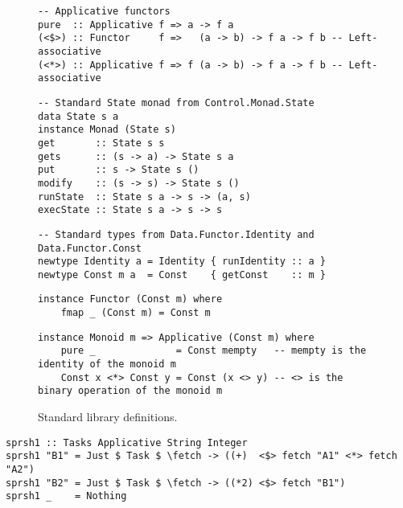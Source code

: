 \begin{figure}
\begin{verbatim}
-- Applicative functors
pure  :: Applicative f => a -> f a
(<$>) :: Functor     f =>   (a -> b) -> f a -> f b -- Left-associative
(<*>) :: Applicative f => f (a -> b) -> f a -> f b -- Left-associative
\end{verbatim}
\vspace{1mm}
\begin{verbatim}
-- Standard State monad from Control.Monad.State
data State s a
instance Monad (State s)
get       :: State s s
gets      :: (s -> a) -> State s a
put       :: s -> State s ()
modify    :: (s -> s) -> State s ()
runState  :: State s a -> s -> (a, s)
execState :: State s a -> s -> s
\end{verbatim}
\vspace{1mm}
\begin{verbatim}
-- Standard types from Data.Functor.Identity and Data.Functor.Const
newtype Identity a = Identity { runIdentity :: a }
newtype Const m a  = Const    { getConst    :: m }
\end{verbatim}
\vspace{1mm}
\begin{verbatim}
instance Functor (Const m) where
    fmap _ (Const m) = Const m
\end{verbatim}
\vspace{1mm}
\begin{verbatim}
instance Monoid m => Applicative (Const m) where
    pure _              = Const mempty   -- mempty is the identity of the monoid m
    Const x <*> Const y = Const (x <> y) -- <> is the binary operation of the monoid m
\end{verbatim}
\caption{Standard library definitions.}\label{fig-stdlib}
\end{figure}

\vspace{1mm}
\begin{verbatim}
sprsh1 :: Tasks Applicative String Integer
sprsh1 "B1" = Just $ Task $ \fetch -> ((+)  <$> fetch "A1" <*> fetch "A2")
sprsh1 "B2" = Just $ Task $ \fetch -> ((*2) <$> fetch "B1")
sprsh1 _    = Nothing
\end{verbatim}
\vspace{1mm}

